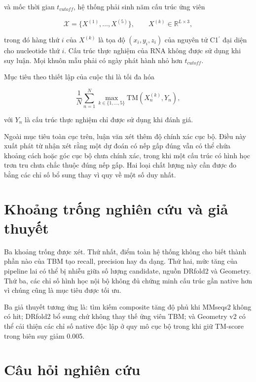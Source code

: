 \documentclass[12pt,a4paper,oneside]{report}
\newcommand{\cprime}{C1$^{\prime}$}
\begin{document}
và mốc thời gian $t_{cutoff}$, hệ thống phải sinh năm cấu trúc ứng viên

\begin{equation}
\mathcal{X}=\{X^{(1)},\ldots,X^{(5)}\},\qquad
X^{(k)}\in\mathbb{R}^{L\times 3},
\end{equation}

trong đó hàng thứ $i$ của $X^{(k)}$ là tọa độ $(x_i,y_i,z_i)$ của nguyên tử
\cprime{} đại diện cho nucleotide thứ $i$. Cấu trúc thực nghiệm của RNA không được sử
dụng khi suy luận. Mọi khuôn mẫu phải có ngày phát hành nhỏ hơn $t_{cutoff}$.

Mục tiêu theo thiết lập của cuộc thi là tối đa hóa

\begin{equation}
\frac{1}{N}\sum_{n=1}^{N}
\max_{k\in\{1,\ldots,5\}}
\mathrm{TM}\!\left(X_n^{(k)},Y_n\right),
\end{equation}

với $Y_n$ là cấu trúc thực nghiệm chỉ được sử dụng khi đánh giá.

Ngoài mục tiêu toàn cục trên, luận văn xét thêm độ chính xác cục bộ. Điều này xuất phát
từ nhận xét rằng một dự đoán có nếp gấp đúng vẫn có thể chứa khoảng cách hoặc góc cục
bộ chưa chính xác, trong khi một cấu trúc có hình học trơn tru chưa chắc thuộc đúng nếp
gấp. Hai loại chất lượng này cần được đo bằng các chỉ số bổ sung thay vì quy về một số
duy nhất.

\section{Khoảng trống nghiên cứu và giả thuyết}

Ba khoảng trống được xét. Thứ nhất, điểm toàn hệ thống không cho biết thành phần nào của
TBM tạo recall, precision hay đa dạng. Thứ hai, mức tăng của pipeline lai có thể bị
nhiễu giữa số lượng candidate, nguồn DRfold2 và Geometry. Thứ ba, các chỉ số hình học
nội bộ không đủ chứng minh cấu trúc gần native hơn vì chúng cũng là mục tiêu được tối ưu.

Ba giả thuyết tương ứng là: tìm kiếm composite tăng độ phủ khi MMseqs2 không có hit;
DRfold2 bổ sung chứ không thay thế ứng viên TBM; và Geometry v2 có thể cải thiện các chỉ
số native độc lập ở quy mô cục bộ trong khi giữ TM-score trong biên suy giảm 0.005.

\section{Câu hỏi nghiên cứu}
\end{document}

